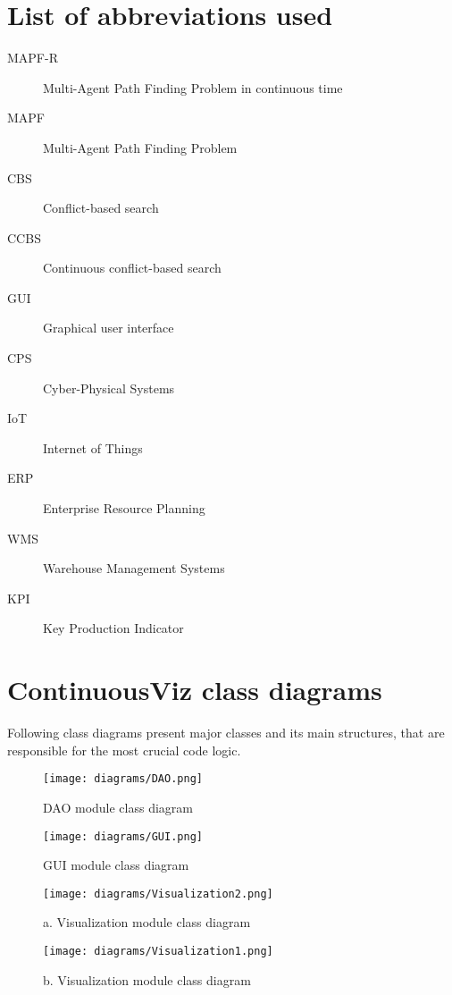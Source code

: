\documentclass[thesis=B,english]{FITthesis}[2019/12/23]
\begin{document}
\appendix

\chapter{List of abbreviations used}
\begin{description}
	\item[MAPF-R] Multi-Agent Path Finding Problem in continuous time
	\item[MAPF] Multi-Agent Path Finding Problem
	\item[CBS] Conflict-based search
	\item[CCBS] Continuous conflict-based search
	\item[GUI] Graphical user interface
	\item[CPS] Cyber-Physical Systems
	\item[IoT] Internet of Things
	\item[ERP] Enterprise Resource Planning
	\item[WMS] Warehouse Management Systems
	\item[KPI] Key Production Indicator
\end{description}

\chapter{ContinuousViz class diagrams}

Following class diagrams present major classes and its main structures, that are responsible for the most crucial code logic.


\begin{figure}
	\texttt{[image: diagrams/DAO.png]}
	\caption[DAO module class diagram]{DAO module class diagram}
\end{figure}


\begin{figure}
	\texttt{[image: diagrams/GUI.png]}
	\caption[GUI module class diagram]{GUI module class diagram}
\end{figure}

\begin{figure}
	\texttt{[image: diagrams/Visualization2.png]}
	\caption[a. Visualization module class diagram]{a. Visualization module class diagram}
\end{figure}

\begin{figure}
	\texttt{[image: diagrams/Visualization1.png]}
	\caption[b. Visualization module class diagram]{b. Visualization module class diagram}
\end{figure}
\end{document}
